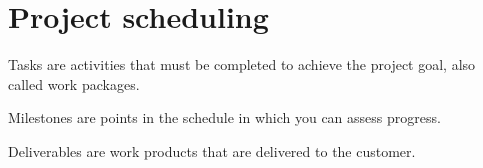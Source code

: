 \section{Project scheduling}

\begin{definition}
    Tasks are activities that must be completed to achieve the project goal, also called work packages. 
\end{definition}
\begin{definition}
    Milestones are points in the schedule in which you can assess progress. 
\end{definition}
\begin{definition}
    Deliverables are work products that are delivered to the customer. 
\end{definition}

